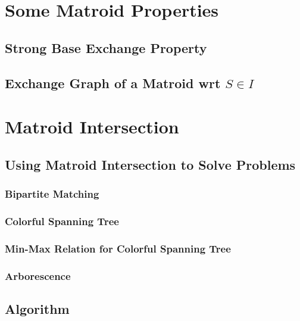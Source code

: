\documentclass[twoside]{article}
\begin{document}
\section{Some Matroid Properties}
\subsection{Strong Base Exchange Property}
\subsection{Exchange Graph of a Matroid wrt ${S\in I}$}

\section{Matroid Intersection}
\subsection{Using Matroid Intersection to Solve Problems}
\subsubsection{Bipartite Matching}
\subsubsection{Colorful Spanning Tree}
\subsubsection{Min-Max Relation for Colorful Spanning Tree}
\subsubsection{Arborescence}
\subsection{Algorithm}





\pagebreak
%
%
\end{document}

